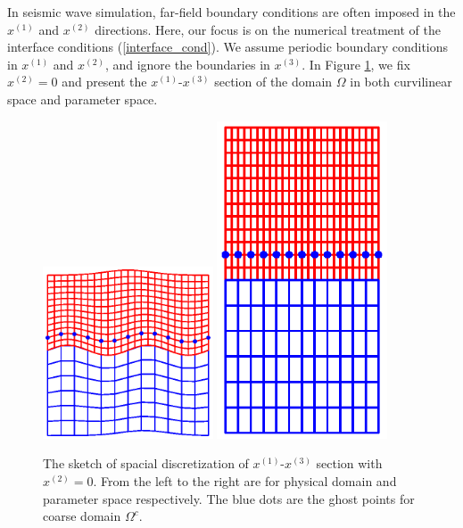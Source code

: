In seismic wave simulation, far-field boundary conditions are often imposed in the $x^{(1)}$ and $x^{(2)}$ directions. Here, our focus is on the numerical treatment of the interface conditions (\ref{interface_cond}). We assume periodic boundary conditions in $x^{(1)}$ and $x^{(2)}$, and ignore the boundaries in $x^{(3)}$. In Figure \ref{section_discretization}, we fix $x^{(2)} = 0$ and present the $x^{(1)}$-$x^{(3)}$ section of the domain $\Omega$ in both curvilinear space and parameter space.
\begin{figure}[htbp]
	\centering
	\includegraphics[width=0.45\textwidth,trim={1.0cm 2.0cm 1.0cm 1.8cm}, clip]{physical_section_discretization.eps}
	\includegraphics[width=0.45\textwidth,trim={1.0cm 2.0cm 1cm 1.8cm}, clip]{parameter_section_discretization.eps}
	\caption{The sketch of spacial discretization of $x^{(1)}$-$x^{(3)}$ section with $x^{(2)} = 0$. From the left to the right are for physical domain and parameter space respectively. The blue dots are the ghost points for coarse domain $\Omega^c$.}\label{section_discretization}
\end{figure}
